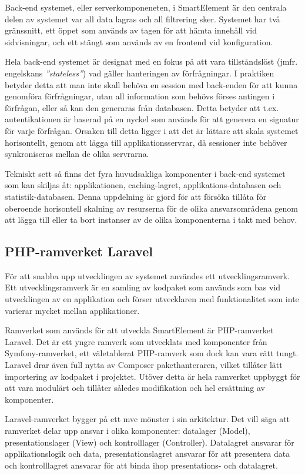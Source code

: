 Back-end systemet, eller serverkomponeneten, i SmartElement är den centrala delen av systemet var all data lagras och all filtrering sker. Systemet har två gränssnitt, ett öppet som används av tagen för att hämta innehåll vid sidvisningar, och ett stängt som används av en frontend vid konfiguration.

Hela back-end systemet är designat med en fokus på att vara tillståndslöst (jmfr. engelskans \textit{''stateless''}) vad gäller hanteringen av förfrågningar. I praktiken betyder detta att man inte skall behöva en session med back-enden för att kunna genomföra förfrågningar, utan all information som behövs förses antingen i förfrågan, eller så kan den generaras från databasen. Detta betyder att t.ex. autentikationen är baserad på en nyckel som används för att generera en signatur för varje förfrågan. Orsaken till detta ligger i att det är lättare att skala systemet horisontellt, genom att lägga till applikationsservrar, då sessioner inte behöver synkroniseras mellan de olika servrarna.

Tekniskt sett så finns det fyra huvudsakliga komponenter i back-end systemet som kan skiljas åt: applikationen, caching-lagret, applikations-databasen och statistik-databasen. Denna uppdelning är gjord för att försöka tillåta för oberoende horisontell skalning av resurserna för de olika ansvarsområdena genom att lägga till eller ta bort instanser av de olika komponenterna i takt med behov.

\subsection{PHP-ramverket Laravel}

För att snabba upp utvecklingen av systemet användes ett utvecklingsramverk. Ett utvecklingsramverk är en samling av kodpaket som används som bas vid utvecklingen av en applikation och förser utvecklaren med funktionalitet som inte varierar mycket mellan applikationer.

Ramverket som används för att utveckla SmartElement är PHP-ramverket Laravel. Det är ett yngre ramverk som utvecklats med komponenter från Symfony-ramverket, ett väletablerat PHP-ramverk som dock kan vara rätt tungt. Laravel drar även full nytta av Composer pakethanteraren, vilket tillåter lätt importering av kodpaket i projektet. Utöver detta är hela ramverket uppbyggt för att vara modulärt och tillåter således modifikation och hel ersättning av komponenter.

Laravel-ramverket bygger på ett \gls{mvc} mönster i sin arkitektur. Det vill säga att ramverket delar upp ansvar i olika komponenter: datalager (Model), presentationslager (View) och kontrolllager (Controller). Datalagret ansvarar för applikationslogik och data, presentationslagret ansvarar för att presentera data och kontrolllagret ansvarar för att binda ihop presentations- och datalagret.\citep[s. 14-16]{gof}

